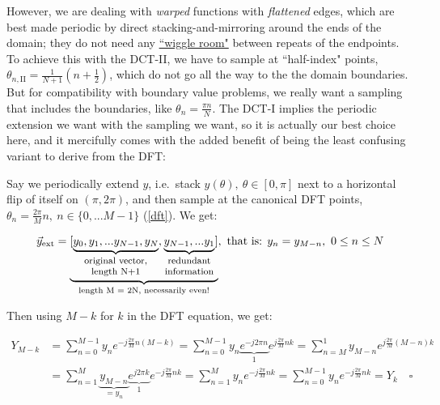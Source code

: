 \documentclass[10pt]{article}
\begin{document}
However, we are dealing with \textit{warped} functions with \textit{flattened} edges, which are best made periodic by direct stacking-and-mirroring around the ends of the domain; they do not need any \href{https://github.com/pavelkomarov/spectral-derivatives/blob/main/notebooks/dct_types_comparison_and_derivatives.ipynb}{``wiggle room"} between repeats of the endpoints. To achieve this with the DCT-II, we have to sample at ``half-index" points, $\theta_{n,\text{II}} = \frac{1}{N+1}(n + \frac{1}{2})$, which do not go all the way to the the domain boundaries. But for compatibility with boundary value problems, we really want a sampling that includes the boundaries, like $\theta_n = \frac{\pi n}{N}$. The DCT-I implies the periodic extension we want with the sampling we want, so it is actually our best choice here, and it mercifully comes with the added benefit of being the least confusing variant to derive from the DFT:

Say we periodically extend $y$, i.e.~stack $y(\theta),\ \theta \in [0,\pi]$ next to a horizontal flip of itself on $(\pi, 2\pi)$, and then sample at the canonical DFT points, $\theta_n = \frac{2\pi}{M}n,\ n \in \{0, ... M-1\}$ (\autoref{dft}). We get:

$$\vec{y}_{\text{ext}} = \underbrace{[\underbrace{y_0, y_1, ... y_{N-1}, y_N}_{\parbox{20mm}{\footnotesize \centering original vector, length N+1}}, \underbrace{y_{N-1}, ... y_1}_{\parbox{16mm}{\footnotesize \centering redundant information}}]}_{\text{length M = 2N, necessarily even!}}, \text{ that is: } y_n = y_{M-n},\ 0 \leq n \leq N$$\vspace{2mm}

Then using $M-k$ for $k$ in the DFT equation, we get:

\begin{align*}
Y_{M-k} &= \sum_{n=0}^{M-1} y_n e^{-j \frac{2\pi}{M}n(M-k)} = \sum_{n=0}^{M-1} y_n \underbrace{e^{-j 2\pi n}}_{1} e^{j \frac{2\pi}{M}nk} = \sum_{n = M}^{1} y_{M-n} e^{j \frac{2\pi}{M}(M - n)k} \\
&= \sum_{n=1}^{M} \underbrace{y_{M-n}}_{= y_n} \underbrace{e^{j 2\pi k}}_{1} e^{-j\frac{2\pi}{M}nk} = \sum_{n=1}^M y_n e^{-j \frac{2\pi}{M}nk} = \sum_{n=0}^{M-1} y_n e^{-j \frac{2\pi}{M}nk} = Y_k \quad \square
\end{align*}
\newline
\end{document}
